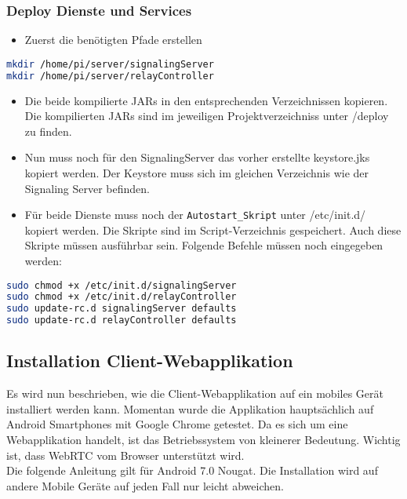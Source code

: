 \subsubsection{Deploy Dienste und Services}
\begin{itemize}
	\item Zuerst die benötigten Pfade erstellen
\end{itemize}

\begin{lstlisting}[backgroundcolor = \color{snippetcolor},
language = bash,
xleftmargin = 0.5cm,
framexleftmargin = 0.1em,
breaklines=true]
mkdir /home/pi/server/signalingServer
mkdir /home/pi/server/relayController
\end{lstlisting}

\begin{itemize}
	\item Die beide kompilierte JARs in den entsprechenden Verzeichnissen kopieren. Die kompilierten JARs sind im jeweiligen Projektverzeichniss unter /deploy zu finden.
	\item Nun muss noch für den SignalingServer das vorher erstellte keystore.jks kopiert werden. Der Keystore muss sich im gleichen Verzeichnis wie der Signaling Server befinden.
	\item Für beide Dienste muss noch der \texttt{Autostart\_Skript} unter /etc/init.d/ kopiert werden. Die Skripte sind im Script-Verzeichnis gespeichert. Auch diese Skripte müssen ausführbar sein. Folgende Befehle müssen noch eingegeben werden:
\end{itemize}

\begin{lstlisting}[backgroundcolor = \color{snippetcolor},
language = bash,
xleftmargin = 0.5cm,
framexleftmargin = 0.1em,
breaklines=true]
sudo chmod +x /etc/init.d/signalingServer
sudo chmod +x /etc/init.d/relayController
sudo update-rc.d signalingServer defaults
sudo update-rc.d relayController defaults 
\end{lstlisting}



\subsection{Installation Client-Webapplikation}
\label{sec:clientappinst}
Es wird nun beschrieben, wie die Client-Webapplikation auf ein mobiles Gerät installiert werden kann.
Momentan wurde die Applikation hauptsächlich auf Android Smartphones mit Google Chrome getestet. Da es sich um eine Webapplikation handelt, ist das Betriebssystem von kleinerer Bedeutung. Wichtig ist, dass WebRTC vom Browser unterstützt wird.
\\
Die folgende Anleitung gilt für Android 7.0 Nougat. Die Installation wird auf andere Mobile Geräte auf jeden Fall nur leicht abweichen. 

